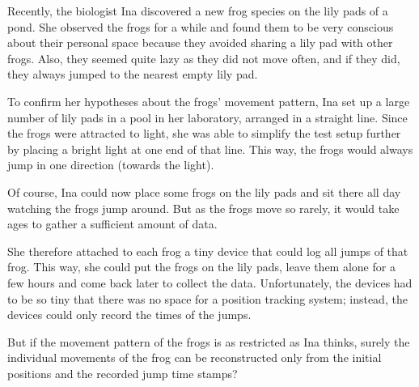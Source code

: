 



%
Recently, the biologist Ina discovered a new frog species
on the lily pads of a pond.
She observed the frogs for a while and found them to be very conscious
about their personal space because they avoided sharing a lily pad with other frogs.
Also, they seemed quite lazy as they did not move often, and if they did,
they always jumped to the nearest empty lily pad.

To confirm her hypotheses about the frogs' movement pattern, Ina set up
a large number of lily pads in a pool in her laboratory, arranged in a straight line.
Since the frogs were attracted to light, she was able to simplify the test setup
further by placing a bright light at one end of that line. This way, the frogs
would always jump in one direction (towards the light).

Of course, Ina could now place some frogs on the lily pads and
sit there all day watching the frogs jump around. But as the frogs
move so rarely, it would take ages to gather a sufficient amount of data.

She therefore attached to each frog a tiny device that could log all jumps of that frog.
This way, she could put the frogs on the lily pads, leave
them alone for a few hours and come back later to collect the data.
Unfortunately, the devices had to be so tiny that there was no space
for a position tracking system; instead, the devices could only record the times of the jumps.

But if the movement pattern of the frogs is as restricted as Ina thinks, surely the
individual movements of the frog can be reconstructed only from the initial positions and
the recorded jump time stamps?

